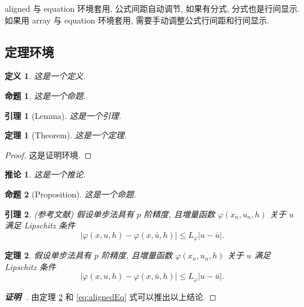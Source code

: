 \documentclass[zihao=-4,twoside,final]{ctexart}
\numberwithin{equation}{section}
\numberwithin{figure}{section}
\numberwithin{table}{section}
\theoremstyle{plain}
\newtheorem{definition}{定义}[section]
\newtheorem{proposition}{命题}[section]
\newtheorem{lemma}{引理}[section]
\newtheorem{theorem}{定理}[section]
\newtheorem{corollary}{推论}[section]
\begin{document}
aligned 与 equation 环境套用, 公式间距自动调节, 如果有分式, 分式也是行间显示. 如果用 array 与 equation 环境套用, 需要手动调整公式行间距和行间显示.


\subsection{定理环境}

\begin{definition}\label{def:foo}
这是一个定义.
\end{definition}

\begin{proposition}\label{prop:foo}
这是一个命题.
\end{proposition}

\begin{lemma}[Lemma]\label{lmm:foo}
这是一个引理.
\end{lemma}

\begin{theorem}[Theorem]\label{thm:foo}
这是一个定理.
\end{theorem}
\begin{proof}
这是证明环境.
\end{proof}

\begin{corollary}\label{cor:foo}
这是一个推论.
\end{corollary}

\begin{proposition}[Proposition]
这是一个命题.
\end{proposition}

\begin{lemma}\label{lmm:convergence} {\rm (\textit{参考文献}\cite{LiLiu1997})}
假设单步法具有 $p$ 阶精度, 且増量函数 $\varphi(x_{n}, u_{n}, h)$ 关于 $u$ 满足 \textup{Lipschitz} 条件
\begin{equation}\label{eq:conver1}
|\varphi(x, u, h)-\varphi(x, \bar{u}, h)| \leqslant L_{\varphi}|u-\bar{u}|.
\end{equation}
\end{lemma}

\begin{theorem}\label{thm:convergence}
假设单步法具有 $p$ 阶精度, 且増量函数 $\varphi(x_{n}, u_{n}, h)$ 关于 $u$ 满足\textup{Lipschitz} 条件
\begin{equation}\label{eq:conver2}
|\varphi(x, u, h)-\varphi(x, \bar{u}, h)| \leqslant L_{\varphi}|u-\bar{u}|.
\end{equation}
\end{theorem}
\begin{proof}[\normalfont\bfseries 证明~\nopunct]
由定理 \ref{lmm:convergence} 和 \eqref{eq:alignedEq} 式可以推出以上结论.
\end{proof}
\end{document}
